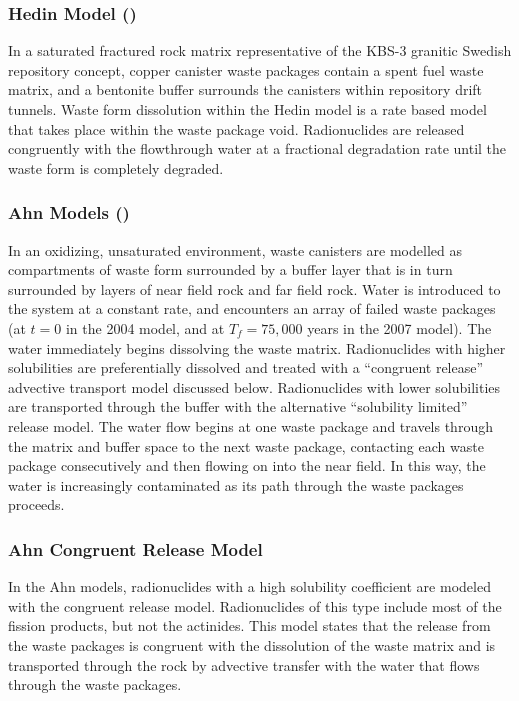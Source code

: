 \subsubsection{Hedin Model (\cite{hedin_integrated_2002})}

In a saturated fractured rock matrix representative of the KBS-3 granitic
Swedish repository concept, copper canister waste packages contain a spent fuel
waste matrix, and a bentonite buffer surrounds the canisters within repository 
drift tunnels. Waste form dissolution within the Hedin model is a rate based
model that takes place within the waste package void. Radionuclides are 
released congruently with the flowthrough water at a fractional degradation 
rate until the waste form is completely degraded.
\cite{hedin_integrated_2002} 

\subsubsection{Ahn Models (\cite{ahn_environmental_2004,
ahn_environmental_2007})}

In an oxidizing, unsaturated environment, waste canisters are modelled as 
compartments of waste form surrounded by a buffer layer that is in turn 
surrounded by layers of near field rock and far field rock. Water is introduced 
to the system at a constant rate, and encounters an array of failed waste 
packages (at $t=0$ in the 2004 model, and at $T_f=75,000$ years in the 2007 model). 
The water immediately begins dissolving the waste matrix.  Radionuclides with higher 
solubilities are preferentially dissolved and treated with a ``congruent 
release'' advective transport model discussed
below. Radionuclides with lower solubilities are transported through the buffer with
the alternative ``solubility limited'' release model. The water flow begins at
one waste package and travels through the matrix and buffer space to the next
waste package, contacting each waste package consecutively and then flowing on
into the near field. In this way, the water is increasingly contaminated as its
path through the waste packages proceeds.  

\subsubsection{Ahn Congruent Release Model} 

In the Ahn models, radionuclides with a high solubility coefficient are modeled with
the congruent release model.  Radionuclides of this type include most of the fission
products, but not the actinides. This model states that the release from the
waste packages is congruent with the dissolution of the waste matrix and is
transported through the rock by advective transfer with the water that flows
through the waste packages.  

